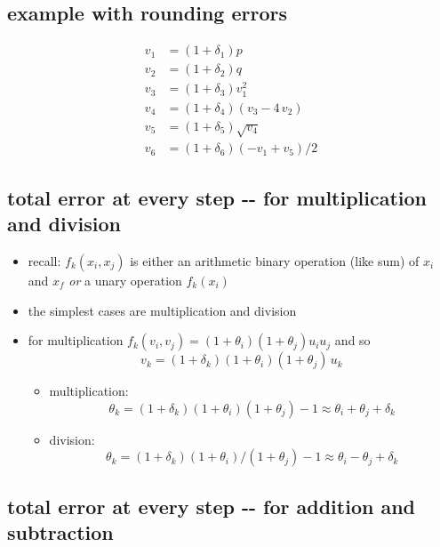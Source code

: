\documentclass[11pt]{article}
\providecommand{\tightlist}{%
      \setlength{\itemsep}{0pt}\setlength{\parskip}{0pt}}
\begin{document}
\subsection{example with rounding
errors}\label{example-with-rounding-errors}

\begin{align*}
v_1 &= (1+\delta_1)p \\
v_2 &= (1+\delta_2)q \\
v_3 &= (1+\delta_3) v_1^2 \\
v_4 &= (1+\delta_4)(v_3 - 4\, v_2) \\
v_5 &= (1+\delta_5)\sqrt{v_4} \\
v_6 &= (1+\delta_6)\left(-v_1+v_5\right)/2
\end{align*}

\subsection{total error at every step -\/- for multiplication and
division}\label{total-error-at-every-step----for-multiplication-and-division}

\begin{itemize}
\item
  recall: \(f_k(x_i, x_j)\) is either an arithmetic binary operation
  (like sum) of \(x_i\) and \(x_f\) \emph{or} a unary operation
  \(f_k(x_i)\)
\item
  the simplest cases are multiplication and division
\item
  for multiplication \(f_k(v_i,v_j) = (1+\theta_i)(1+\theta_j) u_i u_j\)
  and so \[v_k = (1+\delta_k)(1+\theta_i)(1+\theta_j)\, u_k\]

  \begin{itemize}
  \tightlist
  \item
    multiplication:
    \[\theta_k = (1+\delta_k)(1+\theta_i)(1+\theta_j) - 1 \approx \theta_i + \theta_j + \delta_k\]
  \item
    division:
    \[\theta_k = (1+\delta_k)(1+\theta_i)/(1+\theta_j) - 1 \approx \theta_i - \theta_j + \delta_k\]
  \end{itemize}
\end{itemize}

\subsection{total error at every step -\/- for addition and
subtraction}\label{total-error-at-every-step----for-addition-and-subtraction}
\end{document}
